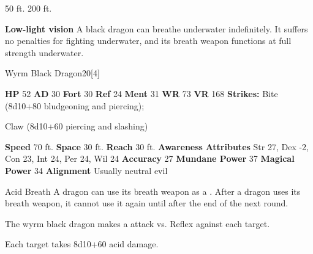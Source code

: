       
       50 ft.
     200 ft.
    \par\noindent\textbf{Low-light vision}
        A black dragon can breathe underwater indefinitely.
        It suffers no penalties for fighting underwater, and its breath weapon functions at full strength underwater.
  

  \begin{monsubsection}{Wyrm Black Dragon}{20}[4]
    \vspace{-1em}\vspace{-1em}
    \vspace{0em}

    
    

    \begin{spellcontent}
      \begin{spelltargetinginfo}
        \pari \textbf{HP} 52 \monsep
          \textbf{AD} 30 \monsep
          \textbf{Fort} 30 \monsep
          \textbf{Ref} 24 \monsep
          \textbf{Ment} 31
        \pari \textbf{WR} 73 \monsep
        \textbf{VR} 168
        \pari \textbf{Strikes:}
            Bite  (8d10+80 bludgeoning and piercing);
\par Claw  (8d10+60 piercing and slashing)
      \end{spelltargetinginfo}
    \end{spellcontent}
    \begin{monsterfooter}
      \pari \textbf{Speed} 70 ft. \monsep
        \textbf{Space} 30 ft. \monsep
        \textbf{Reach} 30 ft.
      \pari \textbf{Awareness} 
      \pari \textbf{Attributes}
        Str 27, Dex -2,
        Con 23, Int 24,
        Per 24, Wil 24
      \pari \textbf{Accuracy} 27 \monsep
        \textbf{Mundane Power} 37 \monsep
      \textbf{Magical Power} 34
      \pari \textbf{Alignment} Usually neutral evil
    \end{monsterfooter}
  \end{monsubsection}
  \begin{freeability}{Acid Breath}
      A dragon can use its breath weapon as a .
      After a dragon uses its breath weapon, it cannot use it again until after the end of the next round.
      \par The wyrm black dragon makes a  attack
        vs. Reflex against each target.
    
    \hit Each target takes 8d10+60 acid damage.
    \end{freeability}
  

